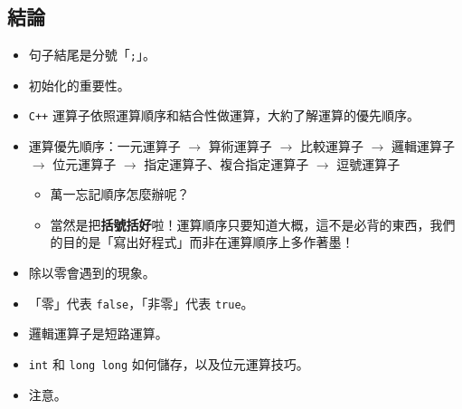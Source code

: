 \documentclass[12pt,a4paper,oneside]{article}
\begin{document}
\begin{CJK}{UTF8}{bkai}
\subsection{結論}

\begin{itemize}
\item 句子結尾是分號「\lstinline!;!」。
\item 初始化的重要性。
\item \texttt{C++} 運算子依照運算順序和結合性做運算，大約了解運算的優先順序。
\item 運算優先順序：一元運算子 $\rightarrow$ 算術運算子 $\rightarrow$ 比較運算子 $\rightarrow$ 邏輯運算子 $\rightarrow$ 位元運算子 $\rightarrow$ 指定運算子、複合指定運算子 $\rightarrow$ 逗號運算子
  \begin{itemize}
  \item 萬一忘記順序怎麼辦呢？
  \item 當然是把\textbf{括號括好}啦！運算順序只要知道大概，這不是必背的東西，我們的目的是「寫出好程式」而非在運算順序上多作著墨！
  \end{itemize}
\item 除以零會遇到的現象。
\item 「零」代表 \lstinline!false!，「非零」代表 \lstinline!true!。
\item 邏輯運算子是短路運算。
\item \lstinline!int! 和 \lstinline!long long! 如何儲存，以及位元運算技巧。
\item 注意。
\end{itemize}

\ifx \allfiles \undefined

\printindex

\clearpage
\end{CJK}
\end{document}
